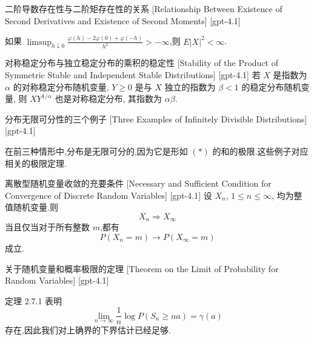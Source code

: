 \documentclass[UTF8]{ctexart}
\begin{document}
    
    
    \begin{thm}
        {二阶导数存在性与二阶矩存在性的关系}
        [Relationship Between Existence of Second Derivatives and Existence of Second Moments]
        [gpt-4.1]
        
如果 $\limsup_{h \downarrow 0} \frac{ \varphi(h) - 2\varphi(0) + \varphi(-h) }{ h^2 } > -\infty$,则 $E|X|^2 < \infty$.

    \end{thm}
    
    
    
    \begin{thm}
        {对称稳定分布与独立稳定分布的乘积的稳定性}
        [Stability of the Product of Symmetric Stable and Independent Stable Distributions]
        [gpt-4.1]
        若 $X$ 是指数为 $\alpha$ 的对称稳定分布随机变量, $Y \geq 0$ 是与 $X$ 独立的指数为 $\beta < 1$ 的稳定分布随机变量, 则 $X Y^{1/\alpha}$ 也是对称稳定分布, 其指数为 $\alpha \beta$.
    \end{thm}
    
    
    
    \begin{xmp}
        {分布无限可分性的三个例子}
        [Three Examples of Infinitely Divisible Distributions]
        [gpt-4.1]
        
在前三种情形中,分布是无限可分的,因为它是形如 $( * )$ 的和的极限.这些例子对应相关的极限定理.

    \end{xmp}
    
    
    
    \begin{thm}
        {离散型随机变量收敛的充要条件}
        [Necessary and Sufficient Condition for Convergence of Discrete Random Variables]
        [gpt-4.1]
        设 $X_n$, $1 \leq n \leq \infty$, 均为整值随机变量.则
\[
X_n \Rightarrow X_\infty
\]
当且仅当对于所有整数 $m$,都有
\[
P(X_n = m) \to P(X_\infty = m)
\]
成立.
    \end{thm}
    
    
    
    \begin{thm}
        {关于随机变量和概率极限的定理}
        [Theorem on the Limit of Probability for Random Variables]
        [gpt-4.1]
        
定理 2.7.1 表明
\[
\lim_{n \to \infty} \frac{1}{n} \log P(S_n \geq n a) = \gamma(a)
\]
存在,因此我们对上确界的下界估计已经足够.

    \end{thm}
    
\end{document}
